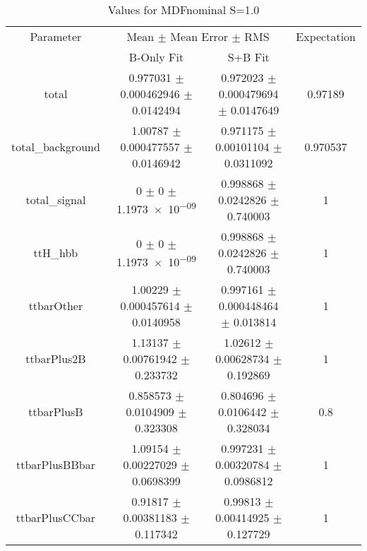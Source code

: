 \begin{table}
\centering
\caption{Values for MDFnominal S=1.0}
\begin{tabular}{cccc}
\toprule
Parameter & \multicolumn{2}{c}{Mean $\pm$ Mean Error $\pm$ RMS} & Expectation\\
 & B-Only Fit & S+B Fit & \\
\midrule
total & \num{0.977031} $\pm$ \num{0.000462946} $\pm$ \num{0.0142494} & \num{0.972023} $\pm$ \num{0.000479694} $\pm$ \num{0.0147649} & \num{0.97189}\\
total\_background & \num{1.00787} $\pm$ \num{0.000477557} $\pm$ \num{0.0146942} & \num{0.971175} $\pm$ \num{0.00101104} $\pm$ \num{0.0311092} & \num{0.970537}\\
total\_signal & \num{0} $\pm$ \num{0} $\pm$ \num{1.1973e-09} & \num{0.998868} $\pm$ \num{0.0242826} $\pm$ \num{0.740003} & \num{1}\\
ttH\_hbb & \num{0} $\pm$ \num{0} $\pm$ \num{1.1973e-09} & \num{0.998868} $\pm$ \num{0.0242826} $\pm$ \num{0.740003} & \num{1}\\
ttbarOther & \num{1.00229} $\pm$ \num{0.000457614} $\pm$ \num{0.0140958} & \num{0.997161} $\pm$ \num{0.000448464} $\pm$ \num{0.013814} & \num{1}\\
ttbarPlus2B & \num{1.13137} $\pm$ \num{0.00761942} $\pm$ \num{0.233732} & \num{1.02612} $\pm$ \num{0.00628734} $\pm$ \num{0.192869} & \num{1}\\
ttbarPlusB & \num{0.858573} $\pm$ \num{0.0104909} $\pm$ \num{0.323308} & \num{0.804696} $\pm$ \num{0.0106442} $\pm$ \num{0.328034} & \num{0.8}\\
ttbarPlusBBbar & \num{1.09154} $\pm$ \num{0.00227029} $\pm$ \num{0.0698399} & \num{0.997231} $\pm$ \num{0.00320784} $\pm$ \num{0.0986812} & \num{1}\\
ttbarPlusCCbar & \num{0.91817} $\pm$ \num{0.00381183} $\pm$ \num{0.117342} & \num{0.99813} $\pm$ \num{0.00414925} $\pm$ \num{0.127729} & \num{1}\\
\bottomrule
\end{tabular}
\end{table}